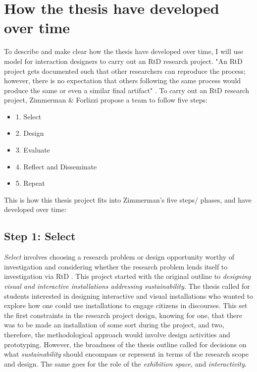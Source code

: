 \section{How the thesis have developed over time}
To describe and make clear how the thesis have developed over time, I will use \autocite{zimmerman_research_2014} model for interaction designers to carry out an RtD research project. "An RtD project gets documented such that other researchers can reproduce the process; however, there is no expectation that others following the same process would produce the same or even a similar final artifact" \autocite[p. 168]{zimmerman_research_2014}. To carry out an RtD research project, Zimmerman \& Forlizzi propose a team to follow five steps:

\begin{itemize}
    \item 1. Select
    \item 2. Design
    \item 3. Evaluate
    \item 4. Reflect and Disseminate
    \item 5. Repeat
\end{itemize}

This is how this thesis project fits into Zimmerman's five steps/ phases, and have developed over time:

\subsection{Step 1: Select}
\textit{Select} involves choosing a research problem or design opportunity worthy of investigation and considering whether the research problem lends itself to investigation via RtD \autocite[p. 185]{zimmerman_research_2014}. This project started with the original outline to \emph{designing visual and interactive installations addressing sustainability}. The thesis called for students interested in designing interactive and visual installations who wanted to explore how one could use installations to engage citizens in discourses. This set the first constraints in the research project design, knowing for one, that there was to be made an installation of some sort during the project, and two, therefore, the methodological approach would involve design activities and prototyping. However, the broadness of the thesis outline called for decisions on what \textit{sustainability} should encompass or represent in terms of the research scope and design. The same goes for the role of the \textit{exhibition space}, and \textit{interactivity}.


